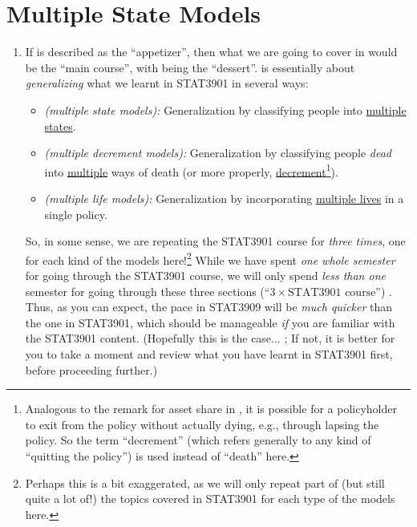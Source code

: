 \section{Multiple State Models}
\label{sect:mult-state-models}
\begin{enumerate}
\item If  is described as the ``appetizer'', then what
we are going to cover in
 would
be the ``main course'', with  being the ``dessert''.
is essentially about \emph{generalizing} what we learnt in STAT3901 in several
ways:
\begin{itemize}
\item \emph{ (multiple state models):}
Generalization by classifying people into \underline{multiple states}.
\item \emph{ (multiple decrement models):}
Generalization by classifying people \emph{dead} into \underline{multiple} ways
of death (or more properly, \underline{decrement}\footnote{Analogous to the
remark for asset share in , it is possible for a
policyholder to exit from the policy without actually dying, e.g., through
lapsing the policy. So the term ``decrement'' (which refers generally to any
kind of ``quitting the policy'') is used instead of ``death'' here.}).
\item \emph{ (multiple life models):}
Generalization by incorporating \underline{multiple lives} in a single policy.
\end{itemize}
So, in some sense, we are repeating the STAT3901 course for \emph{three times},
one for each kind of the models here!\footnote{Perhaps this is a bit
exaggerated, as we will only repeat part of (but still quite a lot of!) the
topics covered in STAT3901 for each type of the models here.} While we have
spent \emph{one whole semester} for going through the STAT3901 course, we will
only spend \emph{less than one} semester for going through these three sections
(``\(3\times \text{STAT3901 course}\)'') .
Thus, as you can expect, the pace in STAT3909 will be \emph{much quicker}
 than the one in STAT3901, which should be
manageable \emph{if} you are familiar with the STAT3901 content. (Hopefully this
is the case...  ; \warn{} If not, it is better
for you to take a moment and review  what you have learnt
in STAT3901 first, before proceeding further.)


\end{enumerate}
